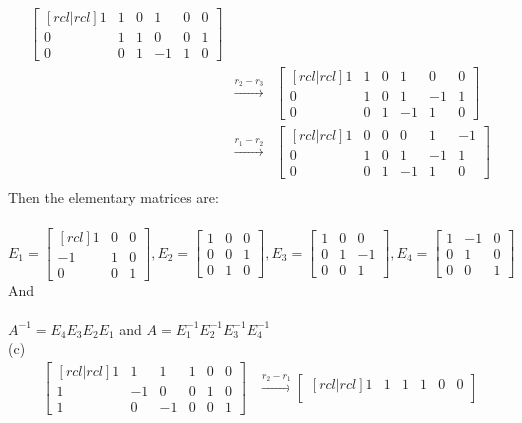 \begin{solution}
\begin{eqnarray*}
\begin{bmatrix}[rcl|rcl]
1&1&0&1&0&0\\
0&1&1&0&0&1\\
0&0&1&-1&1&0
\end{bmatrix}\\
&\xrightarrow[]{r_2-r_3}&
\begin{bmatrix}[rcl|rcl]
1&1&0&1&0&0\\
0&1&0&1&-1&1\\
0&0&1&-1&1&0
\end{bmatrix}\\
&\xrightarrow[]{r_1-r_2}&
\begin{bmatrix}[rcl|rcl]
1&0&0&0&1&-1\\
0&1&0&1&-1&1\\
0&0&1&-1&1&0
\end{bmatrix}\\
\end{eqnarray*}
Then the elementary matrices are:\\
\ \\
$E_1 =
\begin{bmatrix}[rcl]
1&0&0\\
-1&1&0\\
0&0&1
\end{bmatrix},
E_2 =
\begin{bmatrix}
1&0&0\\
0&0&1\\
0&1&0
\end{bmatrix},
E_3 =
\begin{bmatrix}
1&0&0\\
0&1&-1\\
0&0&1
\end{bmatrix},
E_4 =
\begin{bmatrix}
1&-1&0\\
0&1&0\\
0&0&1
\end{bmatrix}
$\\
And\\
\ \\
$A^{-1} = E_4E_3E_2E_1$ and $A=E_1^{-1}E_2^{-1}E_3^{-1}E_4^{-1}$
\\
(c)
\begin{align*}
\begin{bmatrix}[rcl|rcl]
1&1&1&1&0&0\\
1&-1&0&0&1&0\\
1&0&-1&0&0&1
\end{bmatrix}
&\xrightarrow[]{r_2-r_1}
\begin{bmatrix}[rcl|rcl]
1&1&1&1&0&0\\

\end{bmatrix}
\end{align*}
\end{solution}

